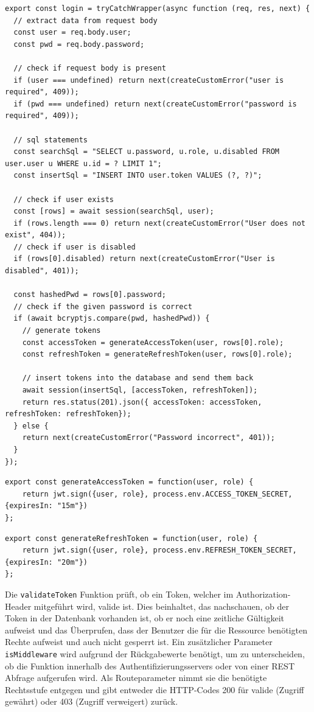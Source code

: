 \documentclass[
    headings=optiontotocandhead,%
    twoside,
    numbers=noenddot,%
    12pt, %
    titlepage, %
    parskip=full, %
    listof=leveldown, 
    numbers=noenddot, %
    a4paper,DIV=14,
    BCOR=15mm,
]{scrbook}
\newcommand{\passthrough}[1]{#1}
\begin{document}
\begin{lstlisting}[caption={Login Funktion}]
export const login = tryCatchWrapper(async function (req, res, next) {
  // extract data from request body
  const user = req.body.user;
  const pwd = req.body.password;

  // check if request body is present
  if (user === undefined) return next(createCustomError("user is required", 409));
  if (pwd === undefined) return next(createCustomError("password is required", 409));

  // sql statements
  const searchSql = "SELECT u.password, u.role, u.disabled FROM user.user u WHERE u.id = ? LIMIT 1";
  const insertSql = "INSERT INTO user.token VALUES (?, ?)";

  // check if user exists
  const [rows] = await session(searchSql, user);
  if (rows.length === 0) return next(createCustomError("User does not exist", 404));
  // check if user is disabled
  if (rows[0].disabled) return next(createCustomError("User is disabled", 401));

  const hashedPwd = rows[0].password;
  // check if the given password is correct
  if (await bcryptjs.compare(pwd, hashedPwd)) {
    // generate tokens
    const accessToken = generateAccessToken(user, rows[0].role);
    const refreshToken = generateRefreshToken(user, rows[0].role);

    // insert tokens into the database and send them back
    await session(insertSql, [accessToken, refreshToken]);
    return res.status(201).json({ accessToken: accessToken, refreshToken: refreshToken});
  } else {
    return next(createCustomError("Password incorrect", 401));
  }
});
\end{lstlisting}

\begin{lstlisting}[caption={Access Token Generierung}]
export const generateAccessToken = function(user, role) {
    return jwt.sign({user, role}, process.env.ACCESS_TOKEN_SECRET, {expiresIn: "15m"})
};
\end{lstlisting}

\begin{lstlisting}[caption={Refresh Token Generierung}]
export const generateRefreshToken = function(user, role) {
    return jwt.sign({user, role}, process.env.REFRESH_TOKEN_SECRET, {expiresIn: "20m"})
};
\end{lstlisting}

Die \passthrough{\lstinline!validateToken!} Funktion prüft, ob ein
Token, welcher im Authorization-Header mitgeführt wird, valide ist. Dies
beinhaltet, das nachschauen, ob der Token in der Datenbank vorhanden
ist, ob er noch eine zeitliche Gültigkeit aufweist und das Überprufen,
dass der Benutzer die für die Ressource benötigten Rechte aufweist und
auch nicht gesperrt ist. Ein zusätzlicher Parameter
\passthrough{\lstinline!isMiddleware!} wird aufgrund der Rückgabewerte
benötigt, um zu unterscheiden, ob die Funktion innerhalb des
Authentifizierungsservers oder von einer REST Abfrage aufgerufen wird.
Als Routeparameter nimmt sie die benötigte Rechtsstufe entgegen und gibt
entweder die HTTP-Codes 200 für valide (Zugriff gewährt) oder 403
(Zugriff verweigert) zurück.
\end{document}

